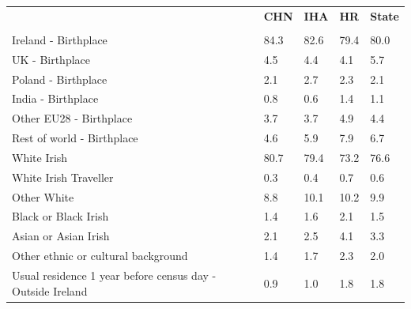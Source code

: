 \documentclass{article}
\begin{document}
\pagebreak
\begin{table}[h]	
\centering
		\begin{tabular}{KTTTT}
  \hline
& \textbf{CHN} & \textbf{IHA} & \textbf{HR}& \textbf{State}\\ 
  \hline
    \\ 
    \hline
Ireland - Birthplace & 84.3& 82.6& 79.4& 80.0\\
UK - Birthplace & 4.5& 4.4& 4.1& 5.7\\
Poland - Birthplace & 2.1& 2.7& 2.3& 2.1\\
India - Birthplace & 0.8& 0.6& 1.4& 1.1\\
Other EU28 - Birthplace & 3.7& 3.7& 4.9& 4.4\\
Rest of world - Birthplace & 4.6& 5.9& 7.9& 6.7\\
    \hline
White Irish & 80.7& 79.4& 73.2& 76.6\\
White Irish Traveller & 0.3& 0.4& 0.7& 0.6\\
Other White &  8.8& 10.1& 10.2&  9.9\\
Black or Black Irish & 1.4& 1.6& 2.1& 1.5\\
Asian or Asian Irish & 2.1& 2.5& 4.1& 3.3\\
Other ethnic or cultural background & 1.4& 1.7& 2.3& 2.0\\
    \hline
Usual residence 1 year before census day - Outside Ireland & 0.9& 1.0& 1.8& 1.8\\


\end{tabular}
\end{table}
\end{document}
